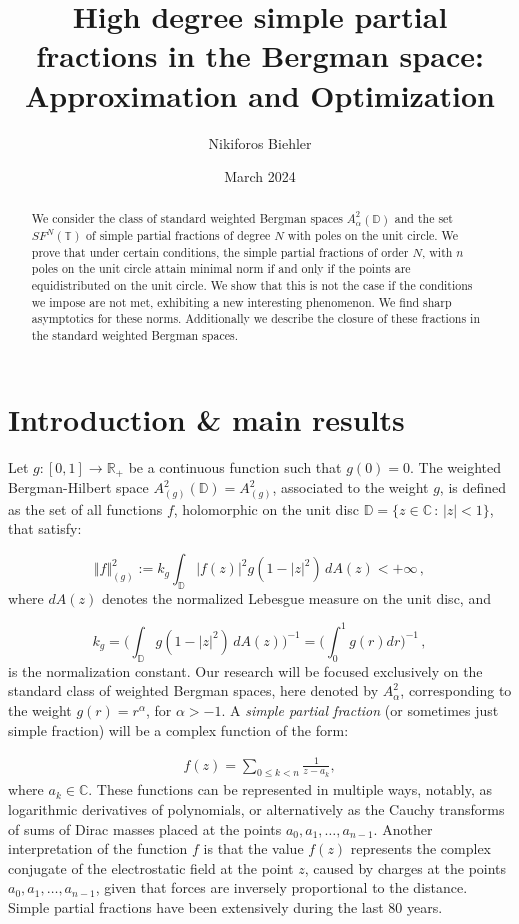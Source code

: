 \documentclass{amsart}[11pt]
\title[High degree simple partial fractions]{ High degree simple partial fractions in the Bergman space: Approximation and Optimization}
\author{Nikiforos Biehler}
\date{March 2024}
\newcommand{\R}{\mathbb{R}} %
\newcommand{\C}{\mathbb{C}} %
\newcommand{\D}{\mathbb{D}} %
\newcommand{\T}{\mathbb{T}} %
\newcommand{\no}[1]{\Vert #1 \Vert} %
\newcommand{\ra}{\rightarrow}
\theoremstyle{definition}
\begin{document}
\begin{abstract}
We consider the class of standard weighted Bergman spaces $A^2_{\alpha}(\D)$ and the set $SF^N(\T)$ of simple partial fractions of degree $N$ with poles on the unit circle. We prove that under certain conditions, the simple partial fractions of order $N$, with $n$ poles on the unit circle attain minimal norm if and only if the points are equidistributed on the unit circle. We show that this is not the case if the conditions we impose are not met, exhibiting a new interesting phenomenon. We find sharp asymptotics for these norms. Additionally we describe the closure of these fractions in the standard weighted Bergman spaces.
\end{abstract}

\maketitle

\section{Introduction \& main results}

Let $g: [0,1] \ra \R_+$ be a continuous function such that $g(0) = 0$. The weighted Bergman-Hilbert space $A^2_{(g)}(\D) = A^2_{(g)}$, associated to the weight $g$, is defined as the set of all functions $f$, holomorphic on the unit disc $\D = \{ z \in \C \, : \, |z| < 1 \} $, that satisfy: 

\begin{equation*}
\no{f}^2_{(g)} := k_g \int_{\D}|f(z)|^2 g(1-|z|^2) \,dA(z) < + \infty \, ,
\end{equation*}
where $dA(z)$ denotes the normalized Lebesgue measure on the unit disc, and

\begin{equation}
k_g = \bigg(\int_{\D}g(1-|z|^2)\,dA(z)\bigg)^{-1} = \bigg(\int_0^1g(r)dr\bigg)^{-1} \, ,
\end{equation}
is the normalization constant. Our research will be focused exclusively on the standard class of weighted Bergman spaces, here denoted by $A^2_{\alpha}$, corresponding to the weight $g(r) = r^{\alpha}$, for $\alpha > -1$. A \textit{simple partial fraction} (or sometimes just simple fraction) will be a complex function of the form:

\begin{gather*}
   f(z) = \sum_{0\leq k < n} \frac{1}{z-a_k} ,
\end{gather*}
where $a_k \in \C$. These functions can be represented in multiple ways, notably, as logarithmic derivatives of polynomials, or alternatively as the Cauchy transforms of sums of Dirac masses placed at the points $a_0, a_1, \ldots, a_{n-1}$. Another interpretation of the function $f$ is that the value $f(z)$ represents the complex conjugate of the electrostatic field at the point $z$, caused by charges at the points $a_0, a_1, \ldots ,a_{n-1}$, given that forces are inversely proportional to the distance. Simple partial fractions have been extensively during the last 80 years. 
\end{document}
